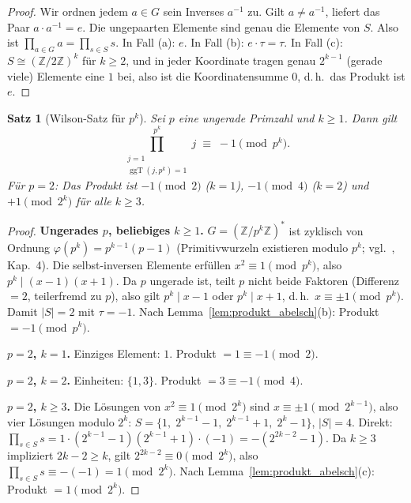 \documentclass[12pt,a4paper]{amsart}
\newtheorem{theorem}{Satz}[section]
\theoremstyle{definition}
\newcommand{\Z}{\mathbb{Z}}
\DeclareMathOperator{\ggT}{ggT}
\begin{document}
\begin{proof}
  Wir ordnen jedem $a \in G$ sein Inverses $a^{-1}$ zu.  Gilt $a \neq a^{-1}$,
  liefert das Paar $a \cdot a^{-1} = e$.  Die ungepaarten Elemente sind genau
  die Elemente von $S$.  Also ist $\prod_{a \in G} a = \prod_{s \in S} s$.
  In Fall (a): $e$.  In Fall (b): $e\cdot\tau = \tau$.
  In Fall (c): $S \cong (\Z/2\Z)^k$ für $k \geq 2$, und in jeder Koordinate
  tragen genau $2^{k-1}$ (gerade viele) Elemente eine $1$ bei, also ist
  die Koordinatensumme $0$, d.\,h.\ das Produkt ist $e$.
\end{proof}

\begin{theorem}[Wilson-Satz für $p^k$]\label{satz:wilson_primzahlpotenz}
  Sei $p$ eine ungerade Primzahl und $k \geq 1$.  Dann gilt
  \[
    \prod_{\substack{j=1 \\ \ggT(j,p^k)=1}}^{p^k} j
    \;\equiv\; -1 \pmod{p^k}.
  \]
  Für $p = 2$: Das Produkt ist $-1 \pmod{2}$ ($k=1$), $-1 \pmod{4}$ ($k=2$)
  und $+1 \pmod{2^k}$ für alle $k \geq 3$.
\end{theorem}

\begin{proof}
  \textbf{Ungerades $p$, beliebiges $k \geq 1$.}
  $G = (\Z/p^k\Z)^*$ ist zyklisch von Ordnung $\varphi(p^k) = p^{k-1}(p-1)$
  (Primitivwurzeln existieren modulo $p^k$; vgl.\ \cite{Ireland1990}, Kap.~4).
  Die selbst-inversen Elemente erfüllen $x^2 \equiv 1 \pmod{p^k}$, also
  $p^k \mid (x-1)(x+1)$.  Da $p$ ungerade ist, teilt $p$ nicht beide Faktoren
  (Differenz $= 2$, teilerfremd zu $p$), also gilt $p^k \mid x-1$ oder $p^k \mid x+1$,
  d.\,h.\ $x \equiv \pm 1 \pmod{p^k}$.  Damit $|S| = 2$ mit $\tau = -1$.
  Nach Lemma~\ref{lem:produkt_abelsch}(b): Produkt $= -1 \pmod{p^k}$.

  \textbf{$p = 2$, $k = 1$.}  Einziges Element: $1$.  Produkt $= 1 \equiv -1 \pmod{2}$.

  \textbf{$p = 2$, $k = 2$.}  Einheiten: $\{1,3\}$.  Produkt $= 3 \equiv -1 \pmod{4}$.

  \textbf{$p = 2$, $k \geq 3$.}
  Die Lösungen von $x^2 \equiv 1 \pmod{2^k}$ sind $x \equiv \pm 1 \pmod{2^{k-1}}$,
  also vier Lösungen modulo $2^k$:
  $S = \{1,\;2^{k-1}-1,\;2^{k-1}+1,\;2^k-1\}$, $|S| = 4$.
  Direkt: $\prod_{s \in S} s = 1\cdot(2^{k-1}-1)(2^{k-1}+1)\cdot(-1) = -(2^{2k-2}-1)$.
  Da $k \geq 3$ impliziert $2k-2 \geq k$, gilt $2^{2k-2} \equiv 0 \pmod{2^k}$,
  also $\prod_{s\in S}s \equiv -(-1) = 1 \pmod{2^k}$.
  Nach Lemma~\ref{lem:produkt_abelsch}(c): Produkt $= 1 \pmod{2^k}$.
\end{proof}
\end{document}
